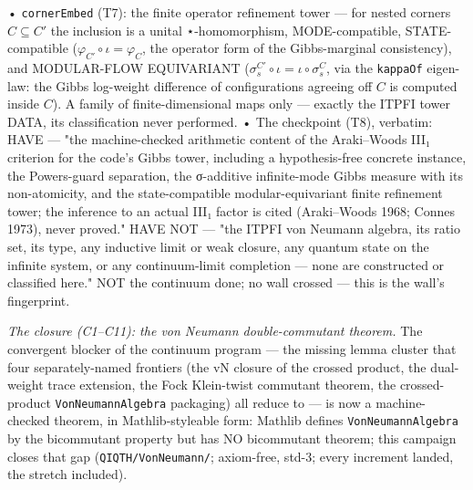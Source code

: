 \documentclass[11pt,a4paper]{article}
\begin{document}
  • \texttt{cornerEmbed} (T7): the finite operator refinement tower --- for nested corners $C\subseteq C'$ the inclusion is a unital ⋆-homomorphism, MODE-compatible, STATE-compatible ($\varphi_{C'}\circ\iota=\varphi_C$, the operator form of the Gibbs-marginal consistency), and MODULAR-FLOW EQUIVARIANT ($\sigma_s^{C'}\circ\iota=\iota\circ\sigma_s^C$, via the \texttt{kappaOf} eigen-law: the Gibbs log-weight difference of configurations agreeing off $C$ is computed inside $C$). A family of finite-dimensional maps only --- exactly the ITPFI tower DATA, its classification never performed.
  • The checkpoint (T8), verbatim: HAVE --- "the machine-checked arithmetic content of the Araki--Woods III₁ criterion for the code's Gibbs tower, including a hypothesis-free concrete instance, the Powers-guard separation, the σ-additive infinite-mode Gibbs measure with its non-atomicity, and the state-compatible modular-equivariant finite refinement tower; the inference to an actual III₁ factor is cited (Araki--Woods 1968; Connes 1973), never proved." HAVE NOT --- "the ITPFI von Neumann algebra, its ratio set, its type, any inductive limit or weak closure, any quantum state on the infinite system, or any continuum-limit completion --- none are constructed or classified here." NOT the continuum done; no wall crossed --- this is the wall's fingerprint.

\emph{The closure (C1--C11): the von Neumann double-commutant theorem.} The convergent blocker of the continuum program — the missing lemma cluster that four separately-named frontiers (the vN closure of the crossed product, the dual-weight trace extension, the Fock Klein-twist commutant theorem, the crossed-product \texttt{VonNeumannAlgebra} packaging) all reduce to — is now a machine-checked theorem, in Mathlib-styleable form: Mathlib defines \texttt{VonNeumannAlgebra} by the bicommutant property but has NO bicommutant theorem; this campaign closes that gap (\texttt{QIQTH/VonNeumann/}; axiom-free, std-3; every increment landed, the stretch included).
\end{document}
